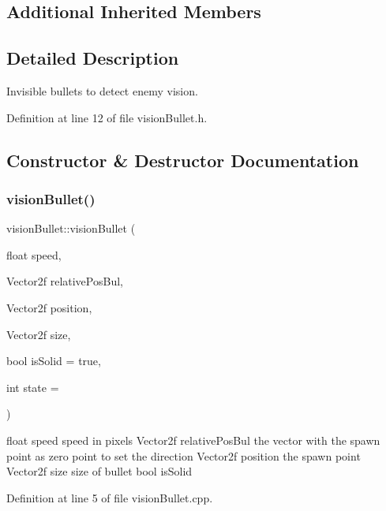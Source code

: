 \subsection*{Additional Inherited Members}


\subsection{Detailed Description}
Invisible bullets to detect enemy vision. 

Definition at line 12 of file vision\+Bullet.\+h.



\subsection{Constructor \& Destructor Documentation}
\mbox{\label{classvision_bullet_af168dc7280da3a5663fc7d91518ff005}} 
\subsubsection{\texorpdfstring{vision\+Bullet()}{visionBullet()}}
{\footnotesize\ttfamily vision\+Bullet\+::vision\+Bullet (\begin{DoxyParamCaption}\item[{float}]{speed,  }\item[{Vector2f}]{relative\+Pos\+Bul,  }\item[{Vector2f}]{position,  }\item[{Vector2f}]{size,  }\item[{bool}]{is\+Solid = {\ttfamily true},  }\item[{int}]{state = {} }\end{DoxyParamCaption})}

float speed speed in pixels Vector2f relative\+Pos\+Bul the vector with the spawn point as zero point to set the direction Vector2f position the spawn point Vector2f size size of bullet bool is\+Solid 

Definition at line 5 of file vision\+Bullet.\+cpp.

\mbox{\label{classvision_bullet_aa96d05163bb81ae5c86f173cbd36de3b}} 
